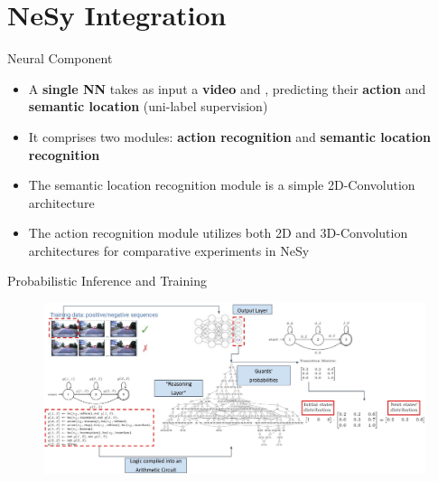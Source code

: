 \documentclass[10pt, aspectratio=169]{beamer}
\begin{document}
\section{NeSy Integration}
{
    \begin{frame}
        \sectionpage%
    \end{frame}
}


\begin{frame}{Neural Component}
    \begin{itemize}
        \setlength{\itemsep}{13pt}
        \item A \textbf{single NN} takes as input a \textbf{video} and  , predicting their \textbf{action} and \textbf{semantic location} (uni-label supervision)
        \item It comprises two modules: \textbf{action recognition} and \textbf{semantic location recognition}
        \item The semantic location recognition module is a simple \textcolor{umBlueLighter}{2D-Convolution} architecture
        \item The action recognition module utilizes both \textcolor{umBlueLighter}{2D} and \textcolor{umBlueLighter}{3D-Convolution} architectures for comparative experiments in NeSy
    \end{itemize}
\end{frame}

\begin{frame}{Probabilistic Inference and Training}
    \begin{figure}
        \includegraphics[width=\textwidth]{contents/images/NeSy_training.jpg}
    \end{figure}
\end{frame}
\end{document}
